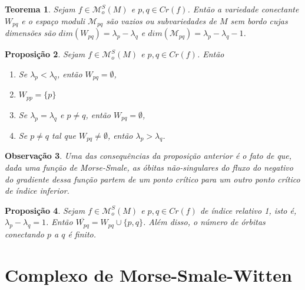 \documentclass[12pt]{book}
\newtheorem{teorema}{Teorema}[section]
\newtheorem{observacao}[teorema]{Observação}
\newtheorem{proposicao}[teorema]{Proposição}
\newcommand{\espacomoduli}[2]{\mathcal{M}_{#1#2}}
\newcommand{\funcoesmorsesmale}[1]{\mathcal{M}^{S}_{o}(#1)}
\newcommand{\pontoscriticos}[1]{\textit{Cr}(#1)}
\newcommand{\variedadeconectantepontos}[2]{W_{#1#2}}
\begin{document}
	 \begin{teorema}
	 	Sejam $f\in \funcoesmorsesmale{M}$ e $p,q \in \pontoscriticos{f}$. Então a variedade conectante $\variedadeconectantepontos{p}{q}$ e o espaço moduli $\espacomoduli{p}{q}$ são vazios ou subvariedades de $M$ sem bordo cujas dimensões são $dim(\variedadeconectantepontos{p}{q}) = \lambda_{p} -\lambda_{q}$ e $dim(\espacomoduli{p}{q}) = \lambda_{p} -\lambda_{q}-1$. 
	 \end{teorema}
	 
	 \begin{proposicao}
	 	Sejam $f \in \funcoesmorsesmale{M}$ e $p,q \in \pontoscriticos{f}$. Então
	 	\begin{enumerate}
	 		\item Se $\lambda_{p}<\lambda_{q}$, então $\variedadeconectantepontos{p}{q} = \emptyset$,
	 		
	 		\item $\variedadeconectantepontos{p}{p} = \{p\}$
	 		
	 		\item Se $\lambda_{p} = \lambda_{q}$ e $p\neq q$, então $\variedadeconectantepontos{p}{q} = \emptyset$,
	 		
	 		\item Se $p \neq q$ tal que $\variedadeconectantepontos{p}{q} \neq \emptyset$, então $\lambda_{p}>\lambda_{q}$.
	 	\end{enumerate}
	 \end{proposicao}

	\begin{observacao}
		Uma das consequências da proposição anterior é o fato de que, dada uma função de Morse-Smale, as óbitas não-singulares do fluxo do negativo do gradiente dessa função partem de um ponto crítico para um outro ponto crítico de índice inferior.
	\end{observacao}
	
	\begin{proposicao}
		Sejam $f \in \funcoesmorsesmale{M}$ e $p,q \in \pontoscriticos{f}$ de índice relativo 1, isto é, $\lambda_{p} - \lambda_{q} = 1$. Então $\overline{\variedadeconectantepontos{p}{q}} = \variedadeconectantepontos{p}{q} \cup \{p,q\}$. Além disso, o número de órbitas conectando $p$ a $q$ é finito.
	\end{proposicao}

	\section{Complexo de Morse-Smale-Witten}
	
\end{document}
